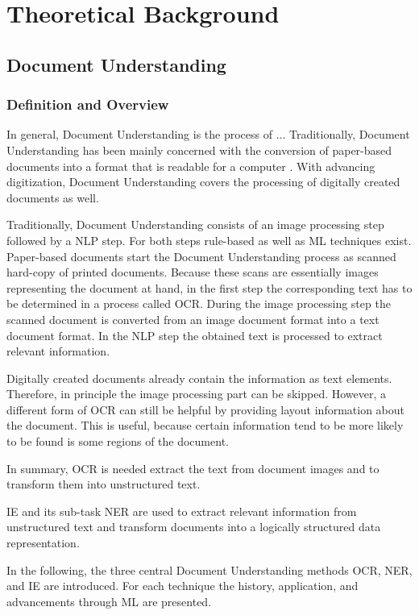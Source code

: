 \chapter{Theoretical Background}

\section{Document Understanding}
\subsection{Definition and Overview}
In general, Document Understanding is the process of ...
Traditionally, Document Understanding has been mainly concerned with the conversion of paper-based documents into a format that is readable for a computer \cite{taylor1994integrated}. 
With advancing digitization, Document Understanding covers the processing of digitally created documents as well. 

Traditionally, Document Understanding consists of an image processing step followed by a \ac{NLP} step. For both steps rule-based as well as \ac{ML} techniques exist. Paper-based documents start the Document Understanding process as scanned hard-copy of printed documents. Because these scans are essentially images representing the document at hand, in the first step the corresponding text has to be determined in a process called \ac{OCR}. During the image processing step the scanned document is converted from an image document format into a text document format. In the \ac{NLP} step the obtained text is processed to extract relevant information.

Digitally created documents already contain the information as text elements. Therefore, in principle the image processing part can be skipped. However, a different form of \ac{OCR} can still be helpful by providing layout information about the document. This is useful, because certain information tend to be more likely to be found is some regions of the document.

In summary, \ac{OCR} is needed extract the text from document images and to transform them into unstructured text.

\ac{IE} and its sub-task \ac{NER} are used to extract relevant information from unstructured text and transform documents into a logically structured data representation.

In the following, the three central Document Understanding methods \ac{OCR}, \ac{NER}, and \ac{IE} are introduced. For each technique the history, application, and advancements through \ac{ML} are presented.
